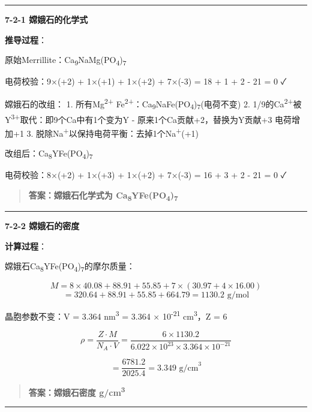 \begin{center}\rule{0.5\linewidth}{0.5pt}\end{center}

\textbf{7-2-1 嫦娥石的化学式}

\textbf{推导过程}：

原始Merrillite：Ca\textsubscript{9}NaMg(PO\textsubscript{4})\textsubscript{7}

电荷校验：9×(+2) + 1×(+1) + 1×(+2) + 7×(-3) = 18 + 1 + 2 - 21 = 0 ✓

嫦娥石的改组：
1. 所有Mg\textsuperscript{2+} \箭 Fe\textsuperscript{2+}：Ca\textsubscript{9}NaFe(PO\textsubscript{4})\textsubscript{7}(电荷不变)
2. 1/9的Ca\textsuperscript{2+}被Y\textsuperscript{3+}取代：即9个Ca中有1个变为Y
- 原来1个Ca贡献+2，替换为Y贡献+3 \箭 电荷增加+1
3. 脱除Na\textsuperscript{+}以保持电荷平衡：去掉1个Na\textsuperscript{+}(+1)

改组后：Ca\textsubscript{8}YFe(PO\textsubscript{4})\textsubscript{7}

电荷校验：8×(+2) + 1×(+3) + 1×(+2) + 7×(-3) = 16 + 3 + 2 - 21 = 0 ✓

\begin{quote}
\textbf{答案：嫦娥石化学式为 Ca\textsubscript{8}YFe(PO\textsubscript{4})\textsubscript{7}}
\end{quote}

\begin{center}\rule{0.5\linewidth}{0.5pt}\end{center}

\textbf{7-2-2 嫦娥石的密度}

\textbf{计算过程}：

嫦娥石Ca\textsubscript{8}YFe(PO\textsubscript{4})\textsubscript{7}的摩尔质量：

\[M = 8 \times 40.08 + 88.91 + 55.85 + 7 \times (30.97 + 4 \times 16.00)\]
\[= 320.64 + 88.91 + 55.85 + 664.79 = 1130.2 \text{ g/mol}\]

晶胞参数不变：V = 3.364 nm\textsuperscript{3} = 3.364 × 10\textsuperscript{-21} cm\textsuperscript{3}，Z = 6

\[\rho = \frac{Z \cdot M}{N_A \cdot V} = \frac{6 \times 1130.2}{6.022 \times 10^{23} \times 3.364 \times 10^{-21}}\]

\[= \frac{6781.2}{2025.4} = 3.349 \text{ g/cm}^3\]

\begin{quote}
\textbf{答案：嫦娥石密度  g/cm\textsuperscript{3}}
\end{quote}

\begin{center}\rule{0.5\linewidth}{0.5pt}\end{center}

